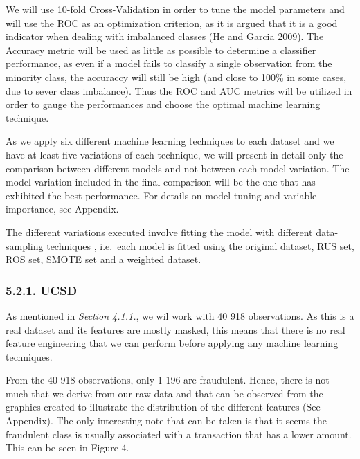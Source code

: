 \documentclass[12pt,]{article}
\begin{document}
We will use 10-fold Cross-Validation in order to tune the model
parameters and will use the ROC as an optimization criterion, as it is
argued that it is a good indicator when dealing with imbalanced classes
(He and Garcia 2009). The Accuracy metric will be used as little as
possible to determine a classifier performance, as even if a model fails
to classify a single observation from the minority class, the accuraccy
will still be high (and close to 100\% in some cases, due to sever class
imbalance). Thus the ROC and AUC metrics will be utilized in order to
gauge the performances and choose the optimal machine learning
technique.

As we apply six different machine learning techniques to each dataset
and we have at least five variations of each technique, we will present
in detail only the comparison between different models and not between
each model variation. The model variation included in the final
comparison will be the one that has exhibited the best performance. For
details on model tuning and variable importance, see Appendix.

The different variations executed involve fitting the model with
different data-sampling techniques , i.e.~each model is fitted using the
original dataset, RUS set, ROS set, SMOTE set and a weighted dataset.

\hypertarget{ucsd}{%
\subsubsection{5.2.1. UCSD}\label{ucsd}}

As mentioned in \emph{Section 4.1.1.}, we wil work with 40 918
observations. As this is a real dataset and its features are mostly
masked, this means that there is no real feature engineering that we can
perform before applying any machine learning techniques.

From the 40 918 observations, only 1 196 are fraudulent. Hence, there is
not much that we derive from our raw data and that can be observed from
the graphics created to illustrate the distribution of the different
features (See Appendix). The only interesting note that can be taken is
that it seems the fraudulent class is usually associated with a
transaction that has a lower amount. This can be seen in Figure 4.
\end{document}
